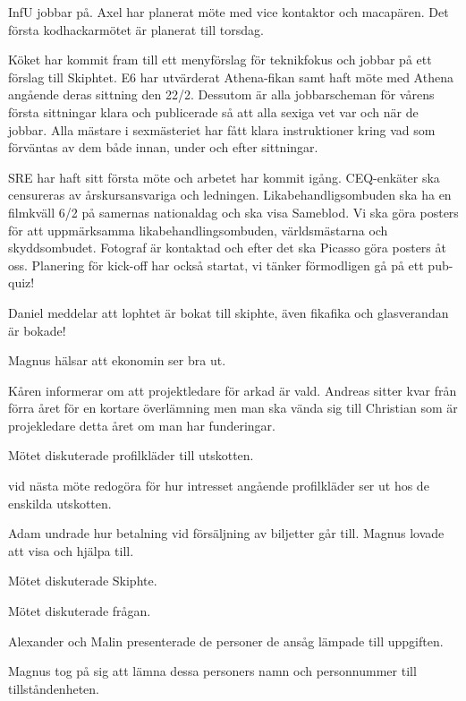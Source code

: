 \documentclass[10pt]{article}
\begin{document}
\begin{paragrafer}
\begin{paragrafer}
InfU jobbar på. Axel har planerat möte med vice kontaktor och macapären. Det första kodhackarmötet är planerat till torsdag.

Köket har kommit fram till ett menyförslag för teknikfokus och jobbar på ett förslag till Skiphtet. E6 har utvärderat Athena-fikan samt haft möte med Athena angående deras sittning den 22/2. Dessutom är alla jobbarscheman för vårens första sittningar klara och publicerade så att alla sexiga vet var och när de jobbar. Alla mästare i sexmästeriet har fått klara instruktioner kring vad som förväntas av dem både innan, under och efter sittningar.

SRE har haft sitt första möte och arbetet har kommit igång. CEQ-enkäter ska censureras av årskursansvariga och ledningen. Likabehandligsombuden ska ha en filmkväll 6/2 på samernas nationaldag och ska visa Sameblod. Vi ska göra posters för att uppmärksamma likabehandlingsombuden, världsmästarna och skyddsombudet. Fotograf är kontaktad och efter det ska Picasso göra posters åt oss. Planering för kick-off har också startat, vi tänker förmodligen gå på ett pub-quiz!

Daniel meddelar att lophtet är bokat till skiphte, även fikafika och glasverandan är bokade!


Magnus hälsar att ekonomin ser bra ut.

Kåren informerar om att projektledare för arkad är vald. Andreas sitter kvar från förra året för en kortare överlämning men man ska vända sig till Christian som är projekledare detta året om man har funderingar.
\end{paragrafer}

Mötet diskuterade profilkläder till utskotten.

\Mba vid nästa möte redogöra för hur intresset angående profilkläder ser ut hos de enskilda utskotten.


Adam undrade hur betalning vid försäljning av biljetter går till. Magnus lovade att visa och hjälpa till.

Mötet diskuterade Skiphte.

Mötet diskuterade frågan.

Alexander och Malin presenterade de personer de ansåg lämpade till uppgiften.

Magnus tog på sig att lämna dessa personers namn och personnummer till tillståndenheten.


\end{paragrafer}
\end{document}
